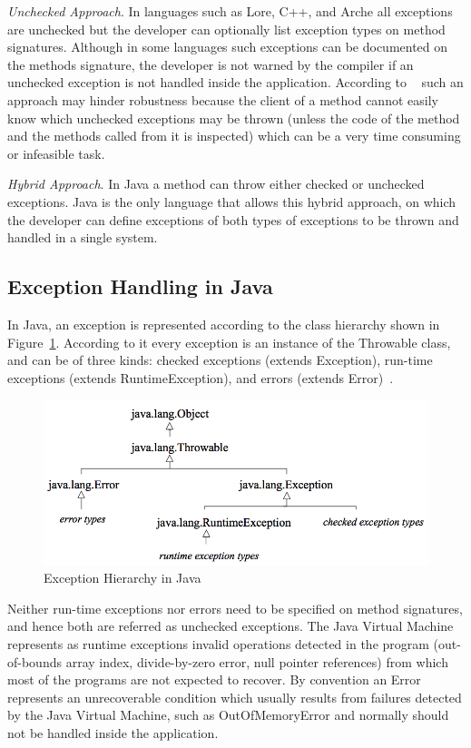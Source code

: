 \documentclass[conference]{IEEEtran}
\begin{document}
\noindent\emph{Unchecked Approach}. In languages such as Lore, C++, and Arche
all exceptions are unchecked but the developer can optionally list exception
types on method signatures. Although in some languages such exceptions can 
be documented on the methods signature, the developer is not warned by the compiler
if an unchecked exception is not handled inside the application. According to ~\cite{Robil00} 
such an approach may hinder robustness because the client of a method cannot easily know
which unchecked exceptions may be thrown (unless the code of the method and the
methods called from it is inspected) which can be a very time consuming or
infeasible task. 

\noindent\emph{Hybrid Approach}. In Java a method can throw either checked or
unchecked exceptions. Java is the only language that allows this hybrid approach,
on which the developer can define exceptions of both types of exceptions to be thrown and
handled in a single system.


\subsection{Exception Handling in Java} \label{sec:extypes}

In Java, an exception is represented according to the class hierarchy shown in
Figure~\ref{fig:exchier}.  According to it every exception is an
instance of the Throwable class, and can be of three kinds: checked exceptions
(extends Exception), run-time exceptions (extends RuntimeException), and errors
(extends Error)~\cite{gosling2000java}.

\begin{figure} \centering \includegraphics[width=\hsize]{new2_hierarchy.png}
  \caption{Exception Hierarchy in Java} \label{fig:exchier} \end{figure}

Neither run-time exceptions nor errors need to be specified on method
signatures, and hence both are referred as unchecked exceptions. The Java
Virtual Machine represents as runtime exceptions invalid operations detected in
the program (out-of-bounds array index, divide-by-zero error, null pointer
references) from which most of the programs are not expected to recover. By
convention an Error represents an unrecoverable condition which usually results
from failures detected by the Java Virtual Machine, such as OutOfMemoryError and
normally should not be handled inside the application.
\end{document}
